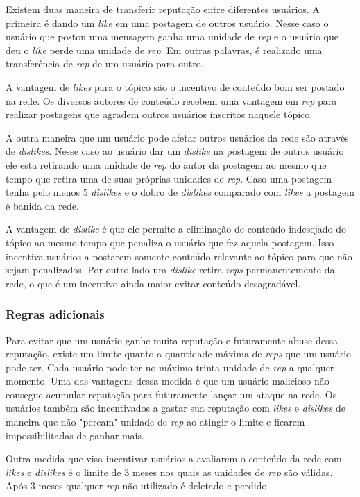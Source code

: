 \documentclass[12pt]{article}
\begin{document}
Existem duas maneira de transferir reputação entre diferentes usuários. A primeira é dando um \emph{like} em uma postagem de outros usuário. Nesse caso o usuário que postou uma mensagem ganha uma unidade de \emph{rep} e o usuário que deu o \emph{like} perde uma unidade de \emph{rep}. Em outras palavras, é realizado uma transferência de \emph{rep} de um usuário para outro. 

A vantagem de \emph{likes} para o tópico são o incentivo de conteúdo  bom ser postado na rede. Os diversos autores de conteúdo recebem uma vantagem em \emph{rep} para realizar postagens que agradem outros usuários inscritos naquele tópico.

A outra maneira que um usuário pode afetar outros usuários da rede são através de \emph{dislikes}. Nesse caso ao usuário dar um \emph{dislike} na postagem de outros usuário ele esta retirando uma unidade de \emph{rep} do autor da postagem ao mesmo que tempo que retira uma de suas próprias unidades de \emph{rep}. Caso uma postagem tenha pelo menos 5 \emph{dislikes} e o dobro de \emph{dislikes} comparado com \emph{likes} a postagem é banida da rede.  

A vantagem de \emph{dislike} é que ele permite a eliminação de conteúdo indesejado do tópico ao mesmo tempo que penaliza o usuário que fez aquela postagem. Isso incentiva usuários a postarem somente conteúdo relevante ao tópico para que não sejam penalizados. Por outro lado um \emph{dislike} retira \emph{reps} permanentemente da rede, o que é um incentivo ainda maior evitar conteúdo desagradável.

\subsubsection{Regras adicionais} \label{subsubsec:+regras}

Para evitar que um usuário ganhe muita reputação e futuramente abuse dessa reputação, existe um limite quanto a quantidade máxima de \emph{reps} que um usuário pode ter. Cada usuário pode ter no máximo trinta unidade de \emph{rep} a qualquer momento. Uma das vantagens dessa medida é que um usuário malicioso não consegue acumular reputação para futuramente lançar um ataque na rede. Os usuários também são incentivados a gastar sua reputação com \emph{likes} e \emph{dislikes} de maneira que não "percam" unidade de \emph{rep} ao atingir o limite e ficarem impossibilitadas de ganhar mais.

Outra medida que visa incentivar usuários a avaliarem o conteúdo da rede com \emph{likes} e \emph{dislikes} é o limite de 3 meses nos quais as unidades de \emph{rep} são válidas. Após 3 meses qualquer \emph{rep} não utilizado é deletado e perdido. 
\end{document}
